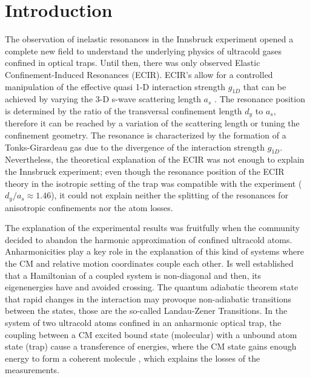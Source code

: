 \documentclass[aps,pre,twocolumn,superscriptaddress,showpacs]{revtex4-1}
\begin{document}
\section{Introduction}  \label{sec:intro}
The observation of inelastic resonances in the Innsbruck experiment \cite{PhysRevLett.104.153203} opened a complete new field to understand the underlying physics of ultracold gases confined in optical traps. Until then, there was only observed Elastic Confinement-Induced Resonances (ECIR). ECIR's allow for a controlled manipulation of the effective quasi 1-D interaction strength $g_{1D}$ that can be achieved by varying the 3-D s-wave scattering length $a_s$ \cite{dunjko2011confinement}. The resonance position is determined by the ratio of the transversal confinement length $d_y$ to $a_s$, therefore it can be reached by a variation of the scattering length or tuning the confinement geometry. The resonance is characterized by the formation of a Tonks-Girardeau gas due to the divergence of the interaction strength $g_{1D}$. Nevertheless, the theoretical explanation of the ECIR was not enough to explain the Innsbruck experiment; even though the resonance position of the ECIR theory in the isotropic setting of the trap was compatible with the experiment ($d_y/a_s\approx 1.46$), it could not explain neither the splitting of the resonances for anisotropic confinements nor the atom losses.

The explanation of the experimental results was fruitfully when the community decided to abandon the harmonic approximation of confined ultracold atoms. Anharmonicities play a key role in the explanation of this kind of systems where the CM and relative motion coordinates couple each other. Is well established that a Hamiltonian of a coupled system is non-diagonal and then, its eigenenergies have and avoided crossing. The quantum adiabatic theorem state that rapid changes in the interaction may provoque non-adiabatic transitions between the states, those are the so-called Landau-Zener Transitions. In the system of two ultracold atoms confined in an anharmonic optical trap, the coupling between a CM excited bound state (molecular) with a unbound atom state (trap) cause a transference of energies, where the CM state gains enough energy to form a coherent molecule \cite{PhysRevLett.110.203202}, which explains the losses of the measurements.
\end{document}
